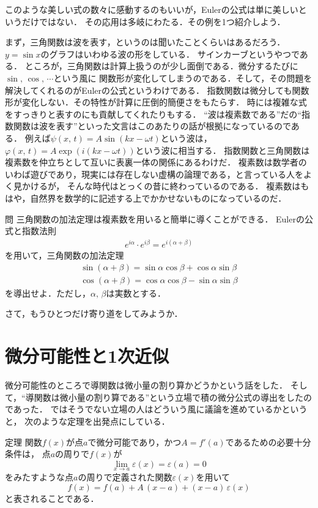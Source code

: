このような美しい式の数々に感動するのもいいが，Eulerの公式は単に美しいというだけではない．
その応用は多岐にわたる．その例を1つ紹介しよう．

まず，三角関数は波を表す，というのは聞いたことくらいはあるだろう．$y=\sin x$のグラフはいわゆる波の形をしている．
サインカーブというやつである．
ところが，三角関数は計算上扱うのが少し面倒である．微分するたびに$\sin, \, \cos, \, \cdots$という風に
関数形が変化してしまうのである．そして，その問題を解決してくれるのがEulerの公式というわけである．
指数関数は微分しても関数形が変化しない．その特性が計算に圧倒的簡便さをもたらす．
時には複雑な式をすっきりと表すのにも貢献してくれたりもする．
``波は複素数である''だの``指数関数は波を表す''といった文言はこのあたりの話が根拠になっているのである．
例えば$\psi (x, \, t) = A \sin (kx-\omega t)$という波は，
$\varphi (x, \, t) = A \exp (i(kx-\omega t))$という波に相当する．
指数関数と三角関数は複素数を仲立ちとして互いに表裏一体の関係にあるわけだ．
複素数は数学者のいわば遊びであり，現実には存在しない虚構の論理である，と言っている人をよく見かけるが，
そんな時代はとっくの昔に終わっているのである．
複素数はもはや，自然界を数学的に記述する上でかかせないものになっているのだ．
\begin{itembox}[l]{問}
三角関数の加法定理は複素数を用いると簡単に導くことができる．
Eulerの公式と指数法則
\begin{align}
e^{ i \alpha } \cdot e^{ i \beta } = e^{ i ( \alpha + \beta ) }
\end{align}
を用いて，三角関数の加法定理
\begin{align}
\sin ( \alpha + \beta ) = \sin \alpha \cos \beta + \cos \alpha \sin \beta \\
\cos ( \alpha + \beta ) = \cos \alpha \cos \beta - \sin \alpha \sin \beta 
\end{align}
を導出せよ．ただし，$\alpha , \, \beta$は実数とする．
\end{itembox}

さて，もうひとつだけ寄り道をしてみようか．
\section{微分可能性と1次近似}
微分可能性のところで導関数は微小量の割り算かどうかという話をした．
そして，``導関数は微小量の割り算である''という立場で積の微分公式の導出をしたのであった．
ではそうでない立場の人はどういう風に議論を進めているかというと，
次のような定理を出発点にしている．
\begin{itembox}[l]{定理}
関数$f(x)$が点$a$で微分可能であり，かつ$A = f'(a)$であるための必要十分条件は，
点$a$の周りで$f(x)$が
\[
\lim_{x \to a} \varepsilon (x) = \varepsilon (a) = 0
\]
をみたすような点$a$の周りで定義された関数$\varepsilon (x)$を用いて
\[
f(x) = f(a) + A \, (x-a) + (x-a) \, \varepsilon (x)
\]
と表されることである．
\end{itembox}

